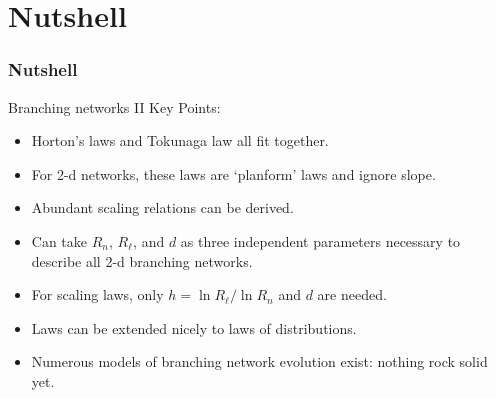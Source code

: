 


\section{Nutshell}

\begin{frame}[label=]
  \frametitle{Nutshell}

  \begin{block}{Branching networks II Key Points:}
    \begin{itemize}
    \item<1->
      Horton's laws and Tokunaga law all fit together.
    \item<2->
      For 2-d networks, these laws are `planform' laws and ignore slope.
    \item<3->
      Abundant scaling relations can be derived.
    \item<4->
      Can take $R_n$, $R_\ell$, and $d$ as three independent parameters
      necessary to describe all 2-d branching networks.
    \item<5->
      For scaling laws, only $h = \ln R_\ell/ \ln R_n$ and $d$ are needed.
    \item<5->
      Laws can be extended nicely to laws of distributions.
    \item<6->
      Numerous models of branching network evolution exist: nothing rock solid yet.
    \end{itemize}
    
  \end{block}

\end{frame}



